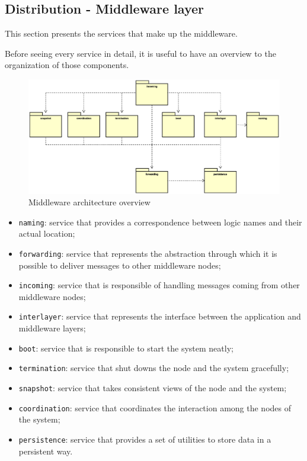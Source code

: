 \subsection{Distribution - Middleware layer}
This section presents the services that make up the middleware.

Before seeing every service in detail, it is useful to have an overview to the
organization of those components.

\begin{figure}[H]
  \centering
  \includegraphics[width=\columnwidth]{images/solution/mw/overview.eps}
  \caption{Middleware architecture overview}
  \label{fig:mw-arch-over}
\end{figure} %

\begin{itemize}
  \item \texttt{naming}: service that provides a correspondence between logic
    names and their actual location;
  \item \texttt{forwarding}: service that represents the abstraction through
    which it is possible to deliver messages to other middleware nodes;
  \item \texttt{incoming}: service that is responsible of handling messages
    coming from other middleware nodes;
  \item \texttt{interlayer}: service that represents the interface between
    the application and middleware layers;
  \item \texttt{boot}: service that is responsible to start the system neatly;
  \item \texttt{termination}: service that shut downs the node and the system
    gracefully;
  \item \texttt{snapshot}: service that takes consistent views of the node and
    the system;
  \item \texttt{coordination}: service that coordinates the interaction among
    the nodes of the system;
  \item \texttt{persistence}: service that provides a set of utilities to
    store data in a persistent way.
\end{itemize}








